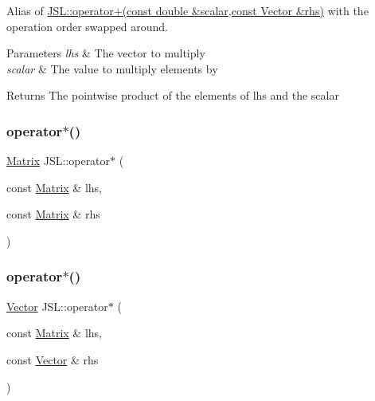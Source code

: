Alias of \hyperlink{namespaceJSL_ac5ceabb8b9e657c5e2d0faf9b20a36e8}{J\+S\+L\+::operator+(const double \&scalar,const Vector \&rhs)} with the operation order swapped around. 


\begin{DoxyParams}{Parameters}
{\em lhs} & The vector to multiply \\
\hline
{\em scalar} & The value to multiply elements by \\
\hline
\end{DoxyParams}
\begin{DoxyReturn}{Returns}
The pointwise product of the elements of lhs and the scalar 
\end{DoxyReturn}
\mbox{\label{namespaceJSL_a95d670e99aed43f857d8ba5e6f3d7897}} 
\subsubsection{\texorpdfstring{operator$\ast$()}{operator*()}\hspace{0.1cm}{\footnotesize\ttfamily [5/8]}}
{\footnotesize\ttfamily \hyperlink{classJSL_1_1Matrix}{Matrix} J\+S\+L\+::operator$\ast$ (\begin{DoxyParamCaption}\item[{const \hyperlink{classJSL_1_1Matrix}{Matrix} \&}]{lhs,  }\item[{const \hyperlink{classJSL_1_1Matrix}{Matrix} \&}]{rhs }\end{DoxyParamCaption})\hspace{0.3cm}{\ttfamily [inline]}}

\mbox{\label{namespaceJSL_a823f5e48d384320644698917c0a1c85c}} 
\subsubsection{\texorpdfstring{operator$\ast$()}{operator*()}\hspace{0.1cm}{\footnotesize\ttfamily [6/8]}}
{\footnotesize\ttfamily \hyperlink{classJSL_1_1Vector}{Vector} J\+S\+L\+::operator$\ast$ (\begin{DoxyParamCaption}\item[{const \hyperlink{classJSL_1_1Matrix}{Matrix} \&}]{lhs,  }\item[{const \hyperlink{classJSL_1_1Vector}{Vector} \&}]{rhs }\end{DoxyParamCaption})\hspace{0.3cm}{\ttfamily [inline]}}

